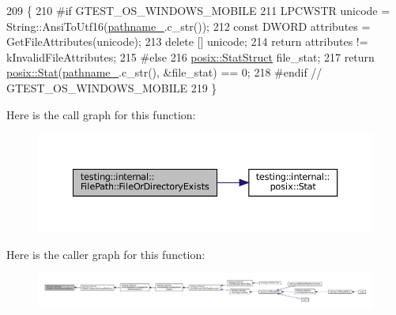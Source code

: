 \begin{DoxyCode}
209                                            \{
210 \textcolor{preprocessor}{#if GTEST\_OS\_WINDOWS\_MOBILE}
211   LPCWSTR unicode = String::AnsiToUtf16(\hyperlink{classtesting_1_1internal_1_1FilePath_a12ce28a0015f85604e0372230fa18d6e}{pathname\_}.c\_str());
212   \textcolor{keyword}{const} DWORD attributes = GetFileAttributes(unicode);
213   \textcolor{keyword}{delete} [] unicode;
214   \textcolor{keywordflow}{return} attributes != kInvalidFileAttributes;
215 \textcolor{preprocessor}{#else}
216   \hyperlink{namespacetesting_1_1internal_1_1posix_a8eb9f08d3af29941c2d2a964cfff3ecb}{posix::StatStruct} file\_stat;
217   \textcolor{keywordflow}{return} \hyperlink{namespacetesting_1_1internal_1_1posix_a2b87b7ff647a128614daf50667eb9304}{posix::Stat}(\hyperlink{classtesting_1_1internal_1_1FilePath_a12ce28a0015f85604e0372230fa18d6e}{pathname\_}.c\_str(), &file\_stat) == 0;
218 \textcolor{preprocessor}{#endif  // GTEST\_OS\_WINDOWS\_MOBILE}
219 \}
\end{DoxyCode}
Here is the call graph for this function\+:
\nopagebreak
\begin{figure}[H]
\begin{center}
\leavevmode
\includegraphics[width=350pt]{classtesting_1_1internal_1_1FilePath_a105bd8fc3adff8fcb4a593532842fb68_cgraph}
\end{center}
\end{figure}
Here is the caller graph for this function\+:
\nopagebreak
\begin{figure}[H]
\begin{center}
\leavevmode
\includegraphics[width=350pt]{classtesting_1_1internal_1_1FilePath_a105bd8fc3adff8fcb4a593532842fb68_icgraph}
\end{center}
\end{figure}
\mbox{\label{classtesting_1_1internal_1_1FilePath_ab47f288e1e9ce5a904eccb94e86c4f99}} 
